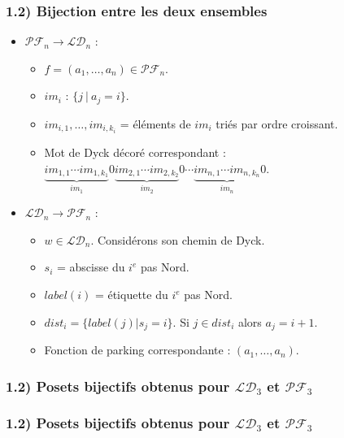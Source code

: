 \documentclass{beamer}
\begin{document}
\begin{frame}
    \frametitle{1.2) \textbf{Bijection} entre les deux ensembles}
    \begin{itemize}
        \item $\mathcal{PF}_n \to \mathcal{LD}_n$ :
        \begin{itemize}
            \item $f = (a_1, \ldots, a_n) \in \mathcal{PF}_n$.
            \item $im_i$ : $\{j\ |\ a_j = i\}$.
            \item $im_{i,1}, \ldots, im_{i,k_i}$ = éléments de $im_i$
                triés par ordre croissant.
            \item Mot de Dyck décoré correspondant : $\underbrace{im_{1,1}
                \cdots im_{1,k_1}}_{im_1}0\underbrace{im_{2,1} \cdots
                im_{2,k_2}}_{im_2}0 \cdots \underbrace{im_{n,1} \cdots 
                im_{n,k_n}}_{im_n}0$.
        \end{itemize}
        \item $\mathcal{LD}_n \to \mathcal{PF}_n$ :
        \begin{itemize}
            \item $w \in \mathcal{LD}_n$. Considérons son chemin de Dyck.
            \item $s_i$ = abscisse du $i^{e}$ pas Nord.
            \item $label(i)$ = étiquette du $i^{e}$ pas Nord.
            \item $dist_i = \{label(j) | s_j = i\}$.
                Si $j \in dist_i$ alors $a_j = i + 1$.
            \item Fonction de parking correspondante : $(a_1, \ldots, a_n)$.
        \end{itemize}
    \end{itemize}
\end{frame}

\begin{frame}
    \frametitle{1.2) Posets \textbf{bijectifs} obtenus pour $\mathcal{LD}_3$
        et $\mathcal{PF}_3$}
    \begin{center}
        
    \end{center}
\end{frame}

\begin{frame}
    \frametitle{1.2) Posets \textbf{bijectifs} obtenus pour $\mathcal{LD}_3$
        et $\mathcal{PF}_3$}
    \begin{center}
        
    \end{center}
\end{frame}
\end{document}
